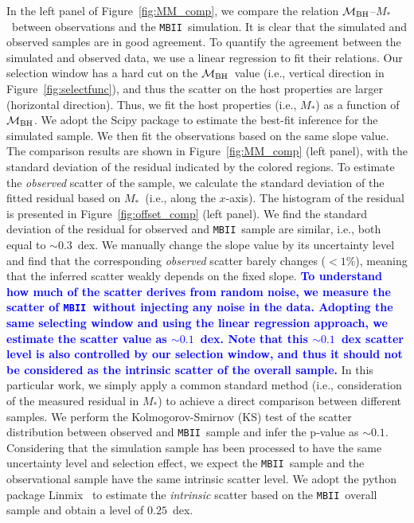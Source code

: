 \documentclass[twocolumn,trackchanges]{aastex63}
\newcommand{\mbh}{$\mathcal M_{\rm BH}$}
\newcommand{\mstar}{{$M_*$}}
\newcommand{\mbii}{\texttt{MBII}}
\newcommand{\blue}[1]{{\textcolor{blue}{\bf #1}}}
\begin{document}
In the left panel of Figure~\ref{fig:MM_comp}, we compare the relation \mbh--\mstar~between observations and the \mbii\ simulation. It is clear that the simulated and observed samples are in good agreement. 
To quantify the agreement between the simulated and observed data, we use a linear regression to fit their relations. Our selection window has a hard cut on the \mbh\ value (i.e., vertical direction in Figure~\ref{fig:selectfunc}), and thus the scatter on the host properties are larger (horizontal direction). Thus, we fit the host properties (i.e., \mstar) as a function of \mbh. We adopt the {\sc Scipy} package to estimate the best-fit inference for the simulated sample. We then fit the observations based on the same slope value. The comparison results are shown in Figure~\ref{fig:MM_comp} (left panel), with the standard deviation of the residual indicated by the colored regions.
To estimate the {\it observed} scatter of the sample, we calculate the standard deviation of the fitted residual based on \mstar\ (i.e., along the $x$-axis). The histogram of the residual is presented in Figure~\ref{fig:offset_comp} (left panel). We find the standard deviation of the residual for observed and \mbii\ sample are similar, i.e., both equal to $\sim0.3$~dex. We manually change the slope value by its uncertainty level and find that the corresponding {\it observed} scatter barely changes ($<1\%$), meaning that the inferred scatter weakly depends on the fixed slope. \blue{To understand how much of the scatter derives from random noise, we measure the scatter of \mbii\ without injecting any noise in the data. Adopting the same selecting window and using the linear regression approach, we estimate the scatter value as $\sim0.1$~dex. Note that this $\sim0.1$~dex scatter level is also controlled by our selection window, and thus it should not be considered as the intrinsic scatter of the overall sample.} In this particular work, we simply apply a common standard method (i.e., consideration of the measured residual in \mstar) to achieve a direct comparison between different samples. We perform the Kolmogorov-Smirnov (KS) test of the scatter distribution between observed and \mbii\ sample and infer the p-value as $\sim0.1$. Considering that the simulation sample has been processed to have the same uncertainty level and selection effect, we expect the \mbii\ sample and the observational sample have the same intrinsic scatter level. We adopt the python package {\sc Linmix}~\citep{Kelly2007} to estimate the {\it intrinsic} scatter based on the \mbii\ overall sample and obtain a level of $0.25$~dex.
\end{document}

